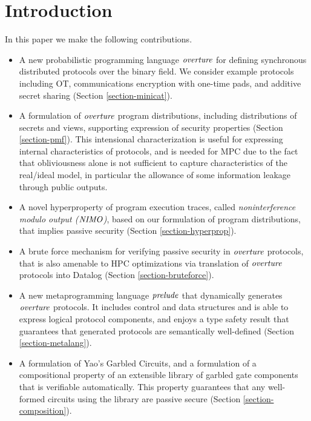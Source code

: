 \section{Introduction}

In this paper we make the following contributions.
\begin{itemize}
\item A new probabilistic programming language $\mathit{overture}$ for defining
  synchronous distributed protocols over the binary field. We consider example
  protocols including OT, communications encryption with one-time
  pads, and additive secret sharing (Section \ref{section-minicat}).
\item A formulation of $\mathit{overture}$ program distributions, including
  distributions of secrets and views, supporting expression of security
  properties (Section \ref{section-pmf}). This intensional characterization
  is useful for expressing internal characteristics of protocols, and
  is needed for MPC due to the fact that obliviousness alone is not sufficient
  to capture characteristics of the real/ideal model, in particular the
  allowance of some information leakage through public outputs. 
\item A novel hyperproperty of program execution traces, called
  \emph{noninterference modulo output ($\mathit{NIMO}$)}, based on our
  formulation of program distributions, that implies passive security
  (Section \ref{section-hyperprop}).
\item A brute force mechanism for verifying passive security in
  $\mathit{overture}$ protocols, that is also amenable to HPC optimizations via
  translation of $\mathit{overture}$ protocols into Datalog (Section \ref{section-bruteforce}). 
\item A new metaprogramming language $\mathit{prelude}$ that dynamically
  generates $\mathit{overture}$ protocols. It includes control and data structures
  and is able to express logical protocol components, and enjoys a
  type safety result that guarantees that generated protocols
  are semantically well-defined (Section \ref{section-metalang}).
\item A formulation of Yao's Garbled Circuits, and a formulation of a
  compositional property of an extensible library of garbled gate
  components that is verifiable automatically. This property
  guarantees that any well-formed circuits using the library are
  passive secure (Section \ref{section-composition}).
\end{itemize}

